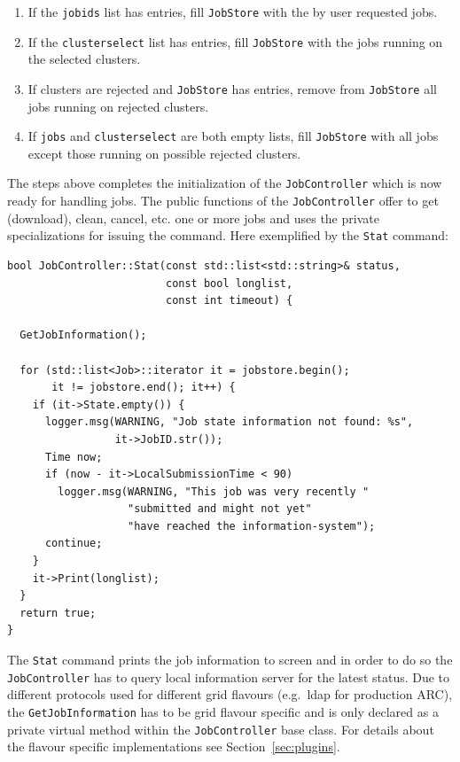 \documentclass{book}
\newcommand{\JobController}{\texttt{JobController}}
\begin{document}
\begin{enumerate}
\item{If the \texttt{jobids} list has entries, fill \texttt{JobStore}
  with the by user requested jobs.}
\item{If the \texttt{clusterselect} list has entries, fill
  \texttt{JobStore} with the jobs running on the selected clusters.}
\item{If clusters are rejected and \texttt{JobStore} has entries,
  remove from \texttt{JobStore} all jobs running on rejected
  clusters.}
\item{If \texttt{jobs} and \texttt{clusterselect} are both empty
  lists, fill \texttt{JobStore} with all jobs except those running on
  possible rejected clusters.}
\end{enumerate}

The steps above completes the initialization of the {\JobController}
which is now ready for handling jobs. The public functions of the
{\JobController} offer to get (download), clean, cancel, etc. one or
more jobs and uses the private specializations for issuing the
command. Here exemplified by the \texttt{Stat} command:

\begin{shaded}
\begin{small}
\begin{verbatim}
bool JobController::Stat(const std::list<std::string>& status,
                         const bool longlist,
                         const int timeout) {

  GetJobInformation();

  for (std::list<Job>::iterator it = jobstore.begin();
       it != jobstore.end(); it++) {
    if (it->State.empty()) {
      logger.msg(WARNING, "Job state information not found: %s",
                 it->JobID.str());
      Time now;
      if (now - it->LocalSubmissionTime < 90)
        logger.msg(WARNING, "This job was very recently "
                   "submitted and might not yet"
                   "have reached the information-system");
      continue;
    }
    it->Print(longlist);
  }
  return true;
}
\end{verbatim}
\end{small}
\end{shaded}

The \texttt{Stat} command prints the job information to screen and in
order to do so the {\JobController} has to query local information
server for the latest status. Due to different protocols used for
different grid flavours (e.g.\ ldap for production ARC), the
\texttt{GetJobInformation} has to be grid flavour specific and is only
declared as a private virtual method within the {\JobController} base
class. For details about the flavour specific implementations see
Section~\ref{sec:plugins}.
\end{document}
